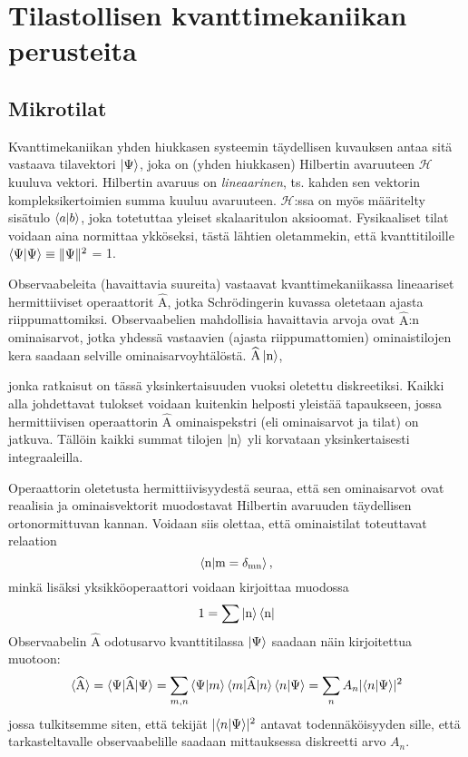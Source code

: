 \documentclass[a4paper, finnish]{article}
\begin{document}
\section{Tilastollisen kvanttimekaniikan perusteita}
\subsection{Mikrotilat}

Kvanttimekaniikan yhden hiukkasen systeemin täydellisen kuvauksen antaa sitä vastaava tilavektori $\ket{\Psi}$, joka on (yhden hiukkasen) Hilbertin avaruuteen $\mathcal{H}$ kuuluva vektori. Hilbertin avaruus on \textit{lineaarinen}, ts. kahden sen vektorin kompleksikertoimien summa kuuluu avaruuteen. $\mathcal{H}$:ssa on myös määritelty sisätulo $\braket{a|b}$, joka totetuttaa yleiset skalaaritulon aksioomat. Fysikaaliset tilat voidaan aina normittaa ykköseksi, tästä lähtien oletammekin, että kvanttitiloille $\braket{\Psi|\Psi}\equiv \|\Psi\|^2$ = 1. 

Observaabeleita (havaittavia suureita) vastaavat kvanttimekaniikassa lineaariset hermittiiviset operaattorit $\widehat{\text{A}}$, jotka Schrödingerin kuvassa oletetaan ajasta riippumattomiksi. Observaabelien mahdollisia havaittavia arvoja ovat $\widehat{\text{A}}$:n ominaisarvot, jotka yhdessä vastaavien (ajasta riippumattomien) ominaistilojen kera saadaan selville ominaisarvoyhtälöstä. $\widehat{\text{A}}\ket{\text{n}}$,

jonka ratkaisut on tässä yksinkertaisuuden vuoksi oletettu diskreetiksi. Kaikki alla johdettavat tulokset voidaan kuitenkin helposti yleistää tapaukseen, jossa hermittiivisen operaattorin $\widehat{\text{A}}$ ominaispekstri (eli ominaisarvot ja tilat) on jatkuva. Tällöin kaikki summat tilojen $\ket{\text{n}}$ yli korvataan yksinkertaisesti integraaleilla.

Operaattorin oletetusta hermittiivisyydestä seuraa, että sen ominaisarvot ovat reaalisia ja ominaisvektorit muodostavat Hilbertin avaruuden täydellisen ortonormittuvan kannan. Voidaan siis olettaa, että ominaistilat toteuttavat relaation
\begin{equation*}
\braket{\text{n}|\text{m} = \delta_{\text{mn}} },
\end{equation*}
minkä lisäksi yksikköoperaattori voidaan kirjoittaa muodossa
\begin{equation*}
1 = \sum \ket{\text{n}}\bra{\text{n}}
\end{equation*}
Observaabelin $\widehat{\text{A}}$ odotusarvo kvanttitilassa $\ket{\Psi}$ saadaan näin kirjoitettua muotoon:
\begin{equation*}
\braket{\widehat{\text{A}}} = \braket{\Psi|\widehat{\text{A}}|\Psi} = \sum_{m,n} \braket{\Psi|m}\braket{m|\widehat{\text{A}}|n}\braket{n|\Psi} = \sum_n A_n\lvert\braket{n|\Psi}\rvert^2 
\end{equation*}
jossa tulkitsemme siten, että tekijät $\lvert\braket{n|\Psi}\rvert^2$ antavat todennäköisyyden sille, että tarkasteltavalle observaabelille saadaan mittauksessa diskreetti arvo $A_n$. 
\end{document}
